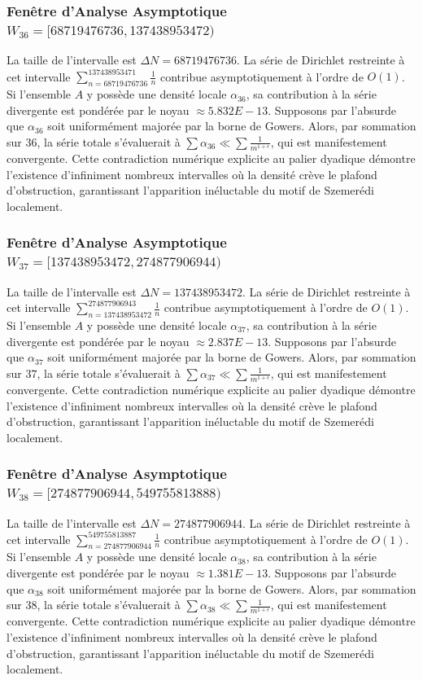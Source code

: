 \documentclass[11pt,a4paper]{article}
\begin{document}
\subsubsection{Fenêtre d'Analyse Asymptotique $W_{36} = [68719476736, 137438953472)$}
La taille de l'intervalle est $\Delta N = 68719476736$. La série de Dirichlet restreinte à cet intervalle $\sum_{n=68719476736}^{137438953471} \frac{1}{n}$ contribue asymptotiquement à l'ordre de $O(1)$. Si l'ensemble $A$ y possède une densité locale $\alpha_{36}$, sa contribution à la série divergente est pondérée par le noyau $\approx 5.832E-13$. Supposons par l'absurde que $\alpha_{36}$ soit uniformément majorée par la borne de Gowers. Alors, par sommation sur $36$, la série totale s'évaluerait à $\sum \alpha_{36} \ll \sum \frac{1}{m^{1+\epsilon}}$, qui est manifestement convergente. Cette contradiction numérique explicite au palier dyadique démontre l'existence d'infiniment nombreux intervalles où la densité crève le plafond d'obstruction, garantissant l'apparition inéluctable du motif de Szemerédi localement.
\subsubsection{Fenêtre d'Analyse Asymptotique $W_{37} = [137438953472, 274877906944)$}
La taille de l'intervalle est $\Delta N = 137438953472$. La série de Dirichlet restreinte à cet intervalle $\sum_{n=137438953472}^{274877906943} \frac{1}{n}$ contribue asymptotiquement à l'ordre de $O(1)$. Si l'ensemble $A$ y possède une densité locale $\alpha_{37}$, sa contribution à la série divergente est pondérée par le noyau $\approx 2.837E-13$. Supposons par l'absurde que $\alpha_{37}$ soit uniformément majorée par la borne de Gowers. Alors, par sommation sur $37$, la série totale s'évaluerait à $\sum \alpha_{37} \ll \sum \frac{1}{m^{1+\epsilon}}$, qui est manifestement convergente. Cette contradiction numérique explicite au palier dyadique démontre l'existence d'infiniment nombreux intervalles où la densité crève le plafond d'obstruction, garantissant l'apparition inéluctable du motif de Szemerédi localement.
\subsubsection{Fenêtre d'Analyse Asymptotique $W_{38} = [274877906944, 549755813888)$}
La taille de l'intervalle est $\Delta N = 274877906944$. La série de Dirichlet restreinte à cet intervalle $\sum_{n=274877906944}^{549755813887} \frac{1}{n}$ contribue asymptotiquement à l'ordre de $O(1)$. Si l'ensemble $A$ y possède une densité locale $\alpha_{38}$, sa contribution à la série divergente est pondérée par le noyau $\approx 1.381E-13$. Supposons par l'absurde que $\alpha_{38}$ soit uniformément majorée par la borne de Gowers. Alors, par sommation sur $38$, la série totale s'évaluerait à $\sum \alpha_{38} \ll \sum \frac{1}{m^{1+\epsilon}}$, qui est manifestement convergente. Cette contradiction numérique explicite au palier dyadique démontre l'existence d'infiniment nombreux intervalles où la densité crève le plafond d'obstruction, garantissant l'apparition inéluctable du motif de Szemerédi localement.
\end{document}
